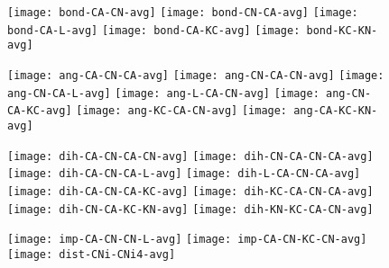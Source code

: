 \documentclass{article}
\begin{document}
\begin{figure}
  \begin{center}
    \begin{minipage}[t]{1.0\textwidth}
      \texttt{[image: bond-CA-CN-avg]}
      \texttt{[image: bond-CN-CA-avg]}
      \texttt{[image: bond-CA-L-avg]}
      \texttt{[image: bond-CA-KC-avg]}
      \texttt{[image: bond-KC-KN-avg]}
    \end{minipage}
  \end{center}
\end{figure}

\begin{figure}
  \begin{center}
    \begin{minipage}[t]{1.0\textwidth}
      \texttt{[image: ang-CA-CN-CA-avg]}
      \texttt{[image: ang-CN-CA-CN-avg]}
      \texttt{[image: ang-CN-CA-L-avg]}
      \texttt{[image: ang-L-CA-CN-avg]}
      \texttt{[image: ang-CN-CA-KC-avg]}
      \texttt{[image: ang-KC-CA-CN-avg]}
      \texttt{[image: ang-CA-KC-KN-avg]}
    \end{minipage}
  \end{center}
\end{figure}

\begin{figure}
  \begin{center}
    \begin{minipage}[t]{1.0\textwidth}
      \texttt{[image: dih-CA-CN-CA-CN-avg]}
      \texttt{[image: dih-CN-CA-CN-CA-avg]}
      \texttt{[image: dih-CA-CN-CA-L-avg]}
      \texttt{[image: dih-L-CA-CN-CA-avg]}
      \texttt{[image: dih-CA-CN-CA-KC-avg]}
      \texttt{[image: dih-KC-CA-CN-CA-avg]}
      \texttt{[image: dih-CN-CA-KC-KN-avg]}
      \texttt{[image: dih-KN-KC-CA-CN-avg]}
    \end{minipage}
  \end{center}
\end{figure}

\begin{figure}
  \begin{center}
    \begin{minipage}[t]{1.0\textwidth}
      \texttt{[image: imp-CA-CN-CN-L-avg]}
      \texttt{[image: imp-CA-CN-KC-CN-avg]}
      \texttt{[image: dist-CNi-CNi4-avg]}
    \end{minipage}
  \end{center}
\end{figure}
\end{document}
